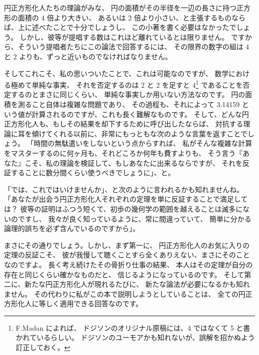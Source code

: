 \documentclass{article}
\begin{document}
円正方形化人たちの理論がみな、
円の面積がその半径を一辺の長さに持つ正方形の面積の 4 倍より大きい、
あるいは 2 倍より小さい、と主張するものならば、上に述べたことで十分でしょうし、
この小著を書く必要はなかったでしょう。
しかし、彼等が提唱する数はこれほど離れているとは限りません。
ですから、そういう提唱者たちにこの論法で回答するには、
その限界の数字の組は 4 と 2 よりも、ずっと近いものでなければなりません。

 そしてこれこそ、私の思いついたことで、これは可能なのですが、
数学における極めて単純な事実、
それを否定するのは 2 と 2 を足すと 4\footnote{F.Madan によれば、
ドジソンのオリジナル原稿には、4 ではなくて 5 と書かれているらしい。
ドジソンのユーモアかも知れないが、誤解を招かぬよう訂正しておく。}
であることを否定するのとまさに同じくらい、
単純な事実しか用いない方法なのです。
円の面積を測ること自体は複雑な問題であり、
その過程も、それによって 3.14159 という値が計算されるのですが、これも長く難解なものです。
そして、どんな円正方形化人も、もしその結果を却下するために呼び出したならば、
対抗する理論に耳を傾けてくれる以前に、非常にもっともな次のような言葉を返すことでしょう。
「時間の無駄遣いをしないという点からすれば、
私がそんな複雑な計算をマスターするのに何ヶ月も、それどころか何年も費すよりも、
そう言う『あなた』こそ、私の理論を検証して、もしあなたに出来るならですが、
それを反証することに数分間くらい使うべきでしょうに」、と。

 「では、これではいけませんか」、と次のように言われるかも知れませんね。
「あなたが出会う円正方形化人それぞれの定理を単に反証することで満足しては？
彼等の証明はふつう短くて、初歩の幾何学の範囲を越えることは滅多にないのですし、
我々が良く知っているように、常に間違っていて、
簡単に分かる論理的誤ちを必ず含んでいるのですから」。

 まさにその通りでしょう。しかし、まず第一に、
円正方形化人のお気に入りの定理の反証こそ、
彼が我慢して聴くことすら全くありえない、まさにそのことなのですよ。
長く考え続けたその骨折り仕事の結果、
本人はその定理が自分の存在と同じくらい確かなものだと、
信じるようになっているのです。
そして第二に、新たな円正方形化人が現れるたびに、
新たな論法が必要になるかも知れません。
その代わりに私がこの本で説明しようとしていることは、
全ての円正方形化人に等しく適用できる回答なのです。
\end{document}
